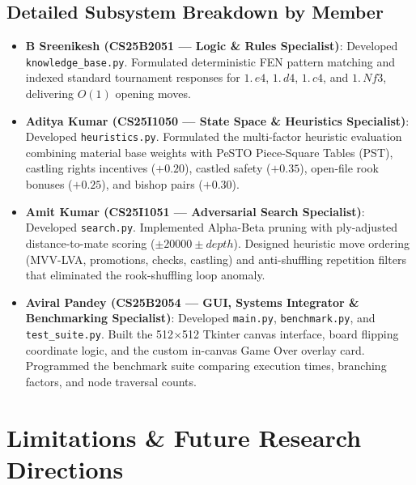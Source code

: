 \documentclass[11pt,a4paper]{article}
\begin{document}
\subsection{Detailed Subsystem Breakdown by Member}
\begin{itemize}[leftmargin=*]
    \item \textbf{B Sreenikesh (CS25B2051 --- Logic \& Rules Specialist)}: Developed \texttt{knowledge\_base.py}. Formulated deterministic FEN pattern matching and indexed standard tournament responses for $1.\,e4$, $1.\,d4$, $1.\,c4$, and $1.\,Nf3$, delivering $O(1)$ opening moves.
    \item \textbf{Aditya Kumar (CS25I1050 --- State Space \& Heuristics Specialist)}: Developed \texttt{heuristics.py}. Formulated the multi-factor heuristic evaluation combining material base weights with PeSTO Piece-Square Tables (PST), castling rights incentives ($+0.20$), castled safety ($+0.35$), open-file rook bonuses ($+0.25$), and bishop pairs ($+0.30$).
    \item \textbf{Amit Kumar (CS25I1051 --- Adversarial Search Specialist)}: Developed \texttt{search.py}. Implemented Alpha-Beta pruning with ply-adjusted distance-to-mate scoring ($\pm 20000 \pm depth$). Designed heuristic move ordering (MVV-LVA, promotions, checks, castling) and anti-shuffling repetition filters that eliminated the rook-shuffling loop anomaly.
    \item \textbf{Aviral Pandey (CS25B2054 --- GUI, Systems Integrator \& Benchmarking Specialist)}: Developed \texttt{main.py}, \texttt{benchmark.py}, and \texttt{test\_suite.py}. Built the 512$\times$512 Tkinter canvas interface, board flipping coordinate logic, and the custom in-canvas Game Over overlay card. Programmed the benchmark suite comparing execution times, branching factors, and node traversal counts.
\end{itemize}

\section{Limitations \& Future Research Directions}
\end{document}
